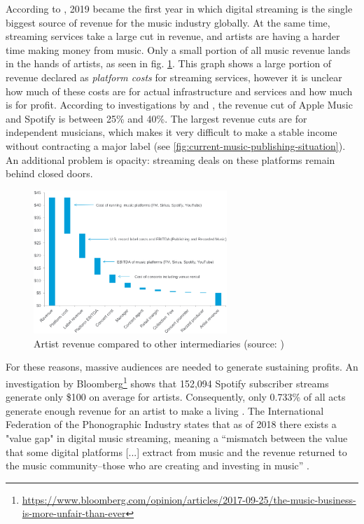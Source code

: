 According to \cite{ifpi2020global}, 2019 became the first year in which digital streaming is the single biggest source of revenue for the music industry globally. At the same time, streaming services take a large cut in revenue, and artists are having a harder time making money from music. Only a small portion of all music revenue lands in the hands of artists, as seen in fig. \ref{fig:artist-revenue}. This graph shows a large portion of revenue declared as \textit{platform costs} for streaming services, however it is unclear how much of these costs are for actual infrastructure and services and how much is for profit. According to investigations by \cite{chris2018dissecting} and \cite{recode2015}, the revenue cut of Apple Music and Spotify is between 25\% and 40\%. The largest revenue cuts are for independent musicians, which makes it very difficult to make a stable income without contracting a major label (see \ref{fig:current-music-publishing-situation}). An additional problem is opacity: streaming deals on these platforms remain behind closed doors. 


\begin{figure}
    \centering
    \includegraphics[width=0.65\textwidth]{problem-description/artist-revenue.png}
    \caption{Artist revenue compared to other intermediaries (source: \cite{bazinet2018putting})}
    \label{fig:artist-revenue}
\end{figure}

For these reasons, massive audiences are needed to generate sustaining profits. An investigation by Bloomberg\footnote{\url{https://www.bloomberg.com/opinion/articles/2017-09-25/the-music-business-is-more-unfair-than-ever}} shows that 152,094 Spotify subscriber streams generate only \$100 on average for artists. Consequently, only 0.733\% of all acts generate enough revenue for an artist to make a living \citep{ingham2018odds}. The International Federation of the Phonographic Industry states that as of 2018 there exists a "value gap" in digital music streaming, meaning a ``mismatch between the value that some digital platforms [...] extract from music and the revenue returned to the music community–those who are creating and investing in music'' \citep{ifpi2018global}.

